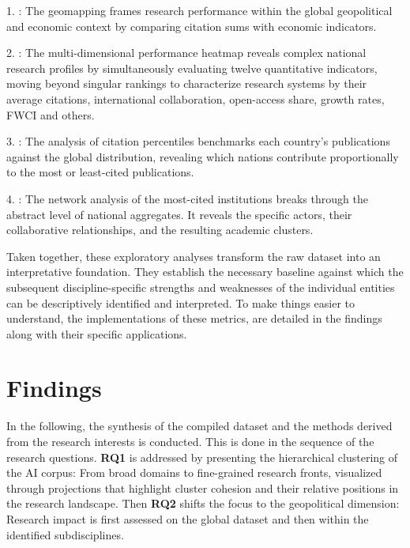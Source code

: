 \documentclass{article}
\begin{document}
	1. : The geomapping frames research performance within the global geopolitical and economic context by comparing citation sums with economic indicators.
	
	2. : The multi-dimensional performance heatmap reveals complex national research profiles by simultaneously evaluating twelve quantitative indicators, moving beyond singular rankings to characterize research systems by their average citations, international collaboration, open-access share, growth rates, FWCI and others.
	
	3. : The analysis of citation percentiles benchmarks each country's publications against the global distribution, revealing which nations contribute proportionally to the most or least-cited publications.
	
	4. : The network analysis of the most-cited institutions breaks through the abstract level of national aggregates. It reveals the specific actors, their collaborative relationships, and the resulting academic clusters.
	
	Taken together, these exploratory analyses transform the raw dataset into an interpretative foundation. They establish the necessary baseline against which the subsequent discipline-specific strengths and weaknesses of the individual entities can be descriptively identified and interpreted.  To make things easier to understand, the implementations of these metrics, are detailed in the findings along with their specific applications.
	
	
	
	\section{Findings}
	\label{sec:findings}
	
	In the following, the synthesis of the compiled dataset and the methods derived from the research interests is conducted. This is done in the sequence of the research questions. \textbf{RQ1} is addressed by presenting the hierarchical clustering of the AI corpus: From broad domains to fine-grained research fronts, visualized through projections that highlight cluster cohesion and their relative positions in the research landscape. Then \textbf{RQ2} shifts the focus to the geopolitical dimension: Research impact is first assessed on the global dataset and then within the identified subdisciplines.
	
\end{document}
